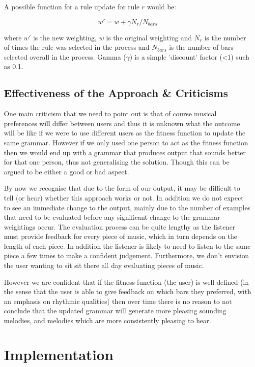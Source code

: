 \documentclass[pdftex,12pt,a4paper]{report}
\begin{document}
A possible function for a rule update for rule $r$ would be:

\[w' = w + \gamma N_r/N_{bars}\]


where $w'$ is the new weighting, $w$ is the original weighting and $N_r$ is the number of times the rule was selected in the process and $N_{bars}$ is the number of bars selected overall in the process. Gamma ($\gamma$) is a simple 'discount' factor (\textless  1) such as 0.1.

\section{Effectiveness of the Approach \& Criticisms}
One main criticism that we need to point out is that of course musical preferences will differ between users and thus it is unknown what the outcome will be like if we were to use different users as the fitness function to update the same grammar. However if we only used one person to act as the fitness function then we would end up with a grammar that produces output that sounds better for that one person, thus not generalising the solution. Though this can be argued to be either a good or bad aspect.

By now we recognise that due to the form of our output, it may be difficult to tell (or hear) whether this approach works or not. In addition we do not expect to see an immediate change to the output, mainly due to the number of examples that need to be evaluated before any significant change to the grammar weightings occur. The evaluation process can be quite lengthy as the listener must provide feedback for every piece of music, which in turn depends on the length of each piece. In addition the listener is likely to need to listen to the same piece a few times to make a confident judgement. Furthermore, we don't envision the user wanting to sit sit there all day evaluating pieces of music.

However we are confident that if the fitness function (the user) is well defined (in the sense that the user is able to give feedback on which bars they preferred, with an emphasis on rhythmic qualities) then over time there is no reason to not conclude that the updated grammar will generate more pleasing sounding melodies, and melodies which are more consistently pleasing to hear.


\chapter{Implementation}
\end{document}
